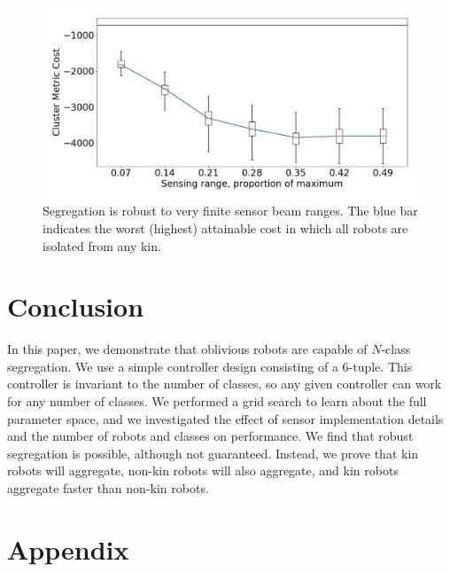 \documentclass[conference]{IEEEtran}
\begin{document}
    \begin{figure}
      \centering
      \includegraphics[width=1\linewidth]{./images/beam_length.png}
      \caption{Segregation is robust to very finite sensor beam ranges. The blue bar indicates the worst (highest) attainable cost in which all robots are isolated from any kin.}
      \label{fig:beam_range}
    \end{figure}

\section{Conclusion}

  In this paper, we demonstrate that oblivious robots are capable of $N$-class segregation. We use a simple controller design consisting of a 6-tuple. This controller is invariant to the number of classes, so any given controller can work for any number of classes. We performed a grid search to learn about the full parameter space, and we investigated the effect of sensor implementation details and the number of robots and classes on performance. We find that robust segregation is possible, although not guaranteed. Instead, we prove that kin robots will aggregate, non-kin robots will also aggregate, and kin robots aggregate faster than non-kin robots.




\onecolumn
\appendix
\section{Appendix}
\end{document}
